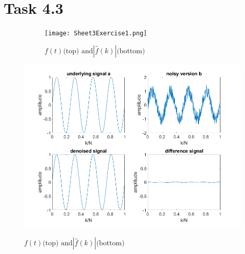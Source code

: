 \documentclass[12pt]{article}
\begin{document}
\section*{Task 4.3}

\begin{figure}[h]\begin{figure}[h]
          \centering
          \texttt{[image: Sheet3Exercise1.png]}
          \caption{$f(t) \text{(top) and} |\hat f(k)| \text{(bottom)}$}
          \label{abb}
      \end{figure}
    \centering
    \includegraphics[width=1.1\textwidth]{ex3.png}
    \label{abb}
\end{figure}
\end{document}
